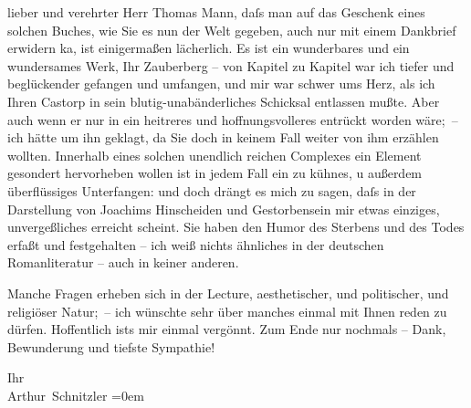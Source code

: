 \pstart{}lieber und verehrter Herr Thomas Mann,\pend\vspace{0.5em}
\pstart
           daſs man auf das Geschenk eines solchen Buches, wie Sie es nun der Welt gegeben, auch
               nur mit einem Dankbrief erwidern ka{\geminationn}, ist einigermaßen
               lächerlich. Es ist ein wunderbares und ein wundersames Werk, Ihr Zauberberg – von Kapitel zu Kapitel war ich tiefer und
               beglückender gefangen und umfangen, und mir war schwer ums Herz, als ich Ihren Castorp in sein
               blutig-unabänderliches Schicksal entlassen mußte. Aber auch wenn er nur in ein
               heitreres und hoffnungsvolleres entrückt worden wäre; – ich hätte um ihn geklagt, da
               Sie doch in keinem Fall weiter von ihm erzählen wollten. Innerhalb {\pb}eines solchen unendlich reichen Complexes ein Element gesondert hervorheben wollen
               ist in jedem Fall ein zu kühnes, u außerdem überflüssiges Unterfangen: und doch
               drängt es mich zu sagen, daſs in der Darstellung von Joachims Hinscheiden und Gestorbensein mir etwas einziges,
               unvergeßliches erreicht scheint. Sie haben den Humor des Sterbens und des Todes
               erfaßt und festgehalten – ich weiß nichts ähnliches in der deutschen Romanliteratur –
               auch in keiner anderen.\pend
           
\pstart
           Manche Fragen erheben sich in der Lecture, aesthetischer, und politischer, und
               religiöser Natur; – ich wünschte sehr über manches einmal mit Ihnen reden zu dürfen.
               Hoffentlich ists mir einmal vergönnt. Zum Ende nur nochmals – Dank, Bewunderung und
               tiefste Sympathie!\pend
           
\pstart
           Ihr{\\[\baselineskip]}\spacefill\mbox{Arthur Schnitzler}\pend
           \leftskip=0em{}\endnumbering{}  \newcommand{\dateiname}{L02429}\newcommand{\titel}{Arthur Schnitzler an Thomas Mann, 5. 1. 1925}\newcommand{\editorInnen}{Martin Anton Müller und Gerd-Hermann Susen}
